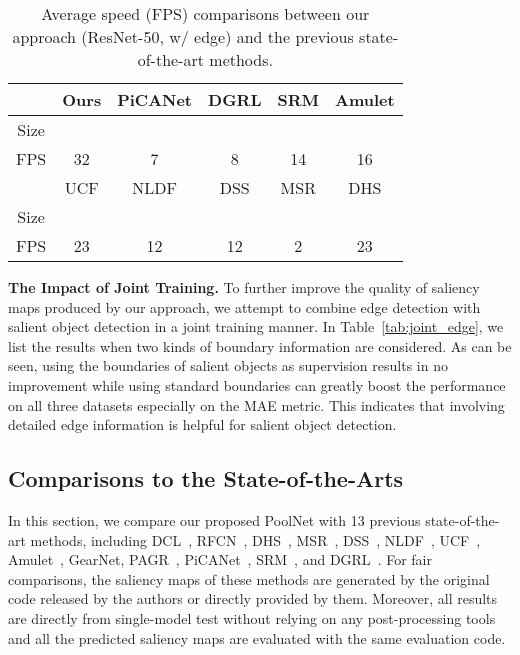 \documentclass[10pt,twocolumn,letterpaper]{article}
\newcommand{\tabref}[1]{Table~\ref{#1}}
\newcommand{\myPara}[1]{\vspace{.05in}\noindent\textbf{#1.}}
\begin{document}
\begin{table}[h]
  \centering
  \footnotesize
  \setlength\tabcolsep{0.9mm}
  \begin{tabular}{c|ccccc} \midrule[1pt]
          & Ours    & PiCANet \cite{liu2018picanet} & DGRL \cite{wang2018detect} & SRM \cite{wang2017stagewise} & Amulet \cite{zhang2017amulet} \\\hline
    Size  &  &  &  &  &   \\\hline
    FPS & 32      &    7    &   8    &   14    &    16    \\
    \midrule[0.7pt]
          & UCF \cite{zhang2017learning} & NLDF \cite{luo2017non}  & DSS \cite{hou2016deeply} & MSR \cite{li2017instance} & DHS \cite{liu2016dhsnet} \\\hline
    Size  &  &  &  &  &  \\\hline
    FPS &   23    &   12    &   12    &  2      &  23     \\
    \midrule[1pt]
  \end{tabular}
  \caption{Average speed (FPS) comparisons between our approach (ResNet-50, w/ edge) and the previous state-of-the-art methods.}
  \label{tab:time}
  \vspace{-10pt}
\end{table}

\myPara{The Impact of Joint Training}
To further improve the quality of saliency maps produced by our approach,
we attempt to combine edge detection with salient object detection in a 
joint training manner.
In \tabref{tab:joint_edge}, we list the results when two kinds of boundary information
are considered.
As can be seen, using the boundaries of salient objects as
supervision results in no improvement
while using standard boundaries can greatly 
boost the performance on all three datasets 
especially on the MAE metric.
This indicates that involving detailed edge information 
is helpful for salient object detection.

\subsection{Comparisons to the State-of-the-Arts}

In this section, we compare our proposed PoolNet with 13 previous state-of-the-art methods,
including DCL~\cite{li2016deep}, RFCN~\cite{wangsaliency}, DHS~\cite{liu2016dhsnet}, MSR~\cite{li2017instance}, DSS~\cite{hou2016deeply}, NLDF~\cite{luo2017non}, UCF~\cite{zhang2017learning},
Amulet~\cite{zhang2017amulet}, GearNet\cite{hou2018three}, PAGR~\cite{zhang2018progressive}, PiCANet~\cite{liu2018picanet},
SRM~\cite{wang2017stagewise}, and DGRL~\cite{wang2018detect}.
For fair comparisons,
the saliency maps of these methods are generated by the original code released by the authors or directly provided by them.
Moreover, all results are directly from single-model test 
without relying on any post-processing tools and all the predicted
saliency maps are evaluated with the same evaluation code.
\end{document}
